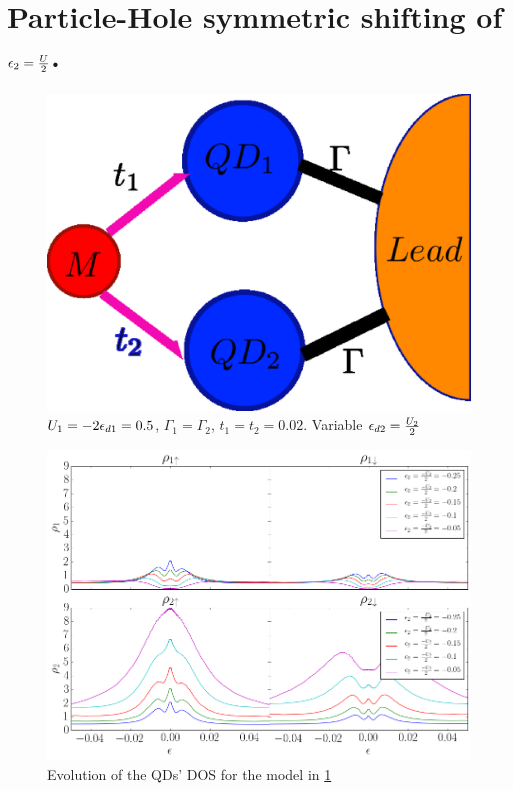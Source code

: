 \newpage



\section{Particle-Hole symmetric shifting of $\epsilon_{2}=\frac{U}{2}$.}

\begin{figure}[h]
\centering
\includegraphics[scale=0.2]{Plots/Model/Majorana-2QD.eps}
\caption{\label{fig:Mod/PHS-Shift_e2.png}$U_{1}=-2\epsilon_{d1}=0.5$, $\Gamma_{1}=\Gamma_{2}$,
$t_{1}=t_2=0.02$. Variable $\epsilon_{d2} =\frac{U_{2}}{2}$}
\end{figure}
\begin{figure}[hbt]
\centering
\includegraphics[scale=0.38]{Plots/DOS/PHS-Shift_e2.png}
\caption{\label{fig:DOS/PHS-Shift_e2.png} Evolution of the QDs' DOS for the model in \ref{fig:Mod/PHS-Shift_e2.png} }
\end{figure}

